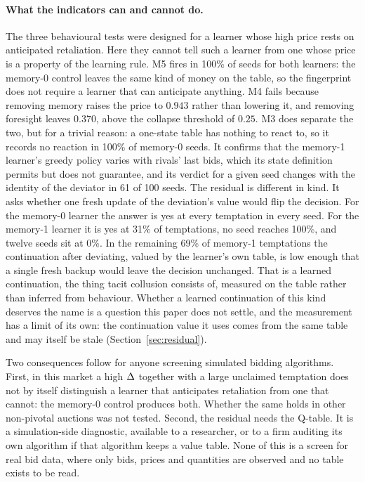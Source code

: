 \paragraph{What the indicators can and cannot do.}
The three behavioural tests were designed for a learner whose high price rests on anticipated retaliation. Here they cannot tell such a learner from one whose price is a property of the learning rule. M5 fires in 100\% of seeds for both learners: the memory-0 control leaves the same kind of money on the table, so the fingerprint does not require a learner that can anticipate anything. M4 fails because removing memory raises the price to $0.943$ rather than lowering it, and removing foresight leaves $0.370$, above the collapse threshold of $0.25$. M3 does separate the two, but for a trivial reason: a one-state table has nothing to react to, so it records no reaction in 100\% of memory-0 seeds. It confirms that the memory-1 learner's greedy policy varies with rivals' last bids, which its state definition permits but does not guarantee, and its verdict for a given seed changes with the identity of the deviator in 61 of 100 seeds. The residual is different in kind. It asks whether one fresh update of the deviation's value would flip the decision. For the memory-0 learner the answer is yes at every temptation in every seed. For the memory-1 learner it is yes at 31\% of temptations, no seed reaches 100\%, and twelve seeds sit at 0\%. In the remaining 69\% of memory-1 temptations the continuation after deviating, valued by the learner's own table, is low enough that a single fresh backup would leave the decision unchanged. That is a learned continuation, the thing tacit collusion consists of, measured on the table rather than inferred from behaviour. Whether a learned continuation of this kind deserves the name is a question this paper does not settle, and the measurement has a limit of its own: the continuation value it uses comes from the same table and may itself be stale (Section~\ref{sec:residual}).

Two consequences follow for anyone screening simulated bidding algorithms. First, in this market a high $\Delta$ together with a large unclaimed temptation does not by itself distinguish a learner that anticipates retaliation from one that cannot: the memory-0 control produces both. Whether the same holds in other non-pivotal auctions was not tested. Second, the residual needs the Q-table. It is a simulation-side diagnostic, available to a researcher, or to a firm auditing its own algorithm if that algorithm keeps a value table. None of this is a screen for real bid data, where only bids, prices and quantities are observed and no table exists to be read.

